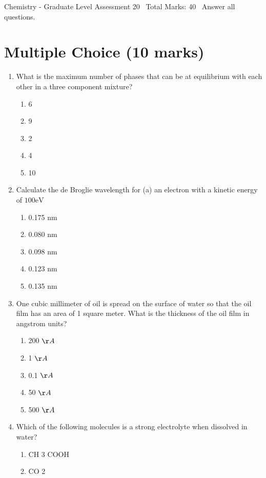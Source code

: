 \documentclass[12pt]{article}
\begin{document}
\begin{center}
Chemistry - Graduate Level Assessment 20 \
Total Marks: 40 \
Answer all questions.
\end{center}

\section*{Multiple Choice (10 marks)}
\begin{enumerate}[label=\arabic*.]
\item What is the maximum number of phases that can be at equilibrium with each other in a three component mixture?
\begin{enumerate}[label=(\alph*)]
    \item 6
    \item 9
    \item 2
    \item 4
    \item 10
\end{enumerate}
\item Calculate the de Broglie wavelength for (a) an electron with a kinetic energy of $100 \mathrm{eV}$
\begin{enumerate}[label=(\alph*)]
    \item 0.175 nm
    \item 0.080 nm
    \item 0.098 nm
    \item 0.123 nm
    \item 0.135 nm
\end{enumerate}
\item One cubic millimeter of oil is spread on the surface of water so that the oil film has an area of 1 square meter. What is the thickness of the oil film in angstrom units?
\begin{enumerate}[label=(\alph*)]
    \item 200 \ensuremath{\AA}
    \item 1 \ensuremath{\AA}
    \item 0.1 \ensuremath{\AA}
    \item 50 \ensuremath{\AA}
    \item 500 \ensuremath{\AA}
\end{enumerate}
\item Which of the following molecules is a strong electrolyte when dissolved in water?
\begin{enumerate}[label=(\alph*)]
    \item CH 3 COOH
    \item CO 2

\end{enumerate}
\end{enumerate}
\end{document}
